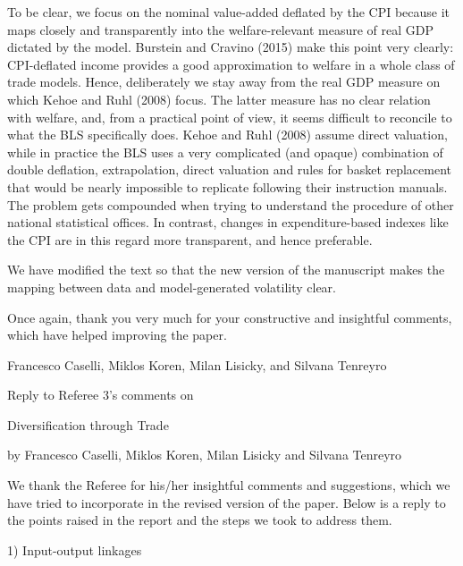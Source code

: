 \documentclass[12pt]{article}
\begin{document}
To be clear, we focus on the nominal value-added deflated by the CPI because
it maps closely and transparently into the welfare-relevant measure of real
GDP dictated by the model. Burstein and Cravino (2015) make this point very
clearly: CPI-deflated income provides a good approximation to welfare in a
whole class of trade models. Hence, deliberately we stay away from the real
GDP measure on which Kehoe and Ruhl (2008) focus. The latter measure has no
clear relation with welfare, and, from a practical point of view, it seems
difficult to reconcile to what the BLS specifically does. Kehoe and Ruhl
(2008) assume direct valuation, while in practice the BLS uses a very
complicated (and opaque) combination of double deflation, extrapolation,
direct valuation and rules for basket replacement that would be nearly
impossible to replicate following their instruction manuals. The problem
gets compounded when trying to understand the procedure of other national
statistical offices. In contrast, changes in expenditure-based indexes like
the CPI are in this regard more transparent, and hence preferable.

We have modified the text so that the new version of the manuscript makes
the mapping between data and model-generated volatility clear.

\bigskip

Once again, thank you very much for your constructive and insightful
comments, which have helped improving the paper.\medskip \medskip \bigskip

Francesco Caselli, Miklos Koren, Milan Lisicky, and Silvana
Tenreyro\pagebreak

\begin{center}
\thispagestyle{plain}\setcounter{page}{1}

Reply to Referee 3's comments on

{\Large Diversification through Trade}

by Francesco Caselli, Miklos Koren, Milan Lisicky and Silvana
Tenreyro\medskip \medskip \bigskip
\end{center}

We thank the Referee for his/her insightful comments and suggestions, which
we have tried to incorporate in the revised version of the paper. Below is a
reply to the points raised in the report and the steps we took to address
them.

\bigskip

1) Input-output linkages
\end{document}
